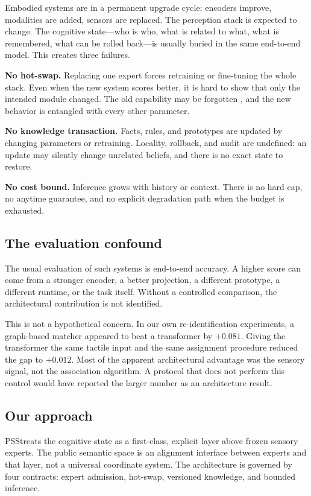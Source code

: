 \documentclass[10pt]{article}
\newcommand{\pss}{PSS}
\begin{document}
Embodied systems are in a permanent upgrade cycle: encoders improve, modalities
are added, sensors are replaced. The perception stack is expected to change.
The cognitive state---who is who, what is related to what, what is remembered,
what can be rolled back---is usually buried in the same end-to-end model. This
creates three failures.

\textbf{No hot-swap.} Replacing one expert forces retraining or fine-tuning the
whole stack. Even when the new system scores better, it is hard to show that
only the intended module changed. The old capability may be forgotten
\citep{kirkpatrick2017ewc}, and the new behavior is entangled with every other
parameter.

\textbf{No knowledge transaction.} Facts, rules, and prototypes are updated by
changing parameters or retraining. Locality, rollback, and audit are undefined:
an update may silently change unrelated beliefs, and there is no exact state to
restore.

\textbf{No cost bound.} Inference grows with history or context. There is no
hard cap, no anytime guarantee, and no explicit degradation path when the
budget is exhausted.

\subsection{The evaluation confound}

The usual evaluation of such systems is end-to-end accuracy. A higher score can
come from a stronger encoder, a better projection, a different prototype, a
different runtime, or the task itself. Without a controlled comparison, the
architectural contribution is not identified.

This is not a hypothetical concern. In our own re-identification experiments, a
graph-based matcher appeared to beat a transformer by $+0.081$. Giving the
transformer the same tactile input and the same assignment procedure reduced the
gap to $+0.012$. Most of the apparent architectural advantage was the sensory
signal, not the association algorithm. A protocol that does not perform this
control would have reported the larger number as an architecture result.

\subsection{Our approach}

\pss treats the cognitive state as a first-class, explicit layer above frozen
sensory experts. The public semantic space is an alignment interface between
experts and that layer, not a universal coordinate system. The architecture is
governed by four contracts: expert admission, hot-swap, versioned knowledge, and
bounded inference.
\end{document}
